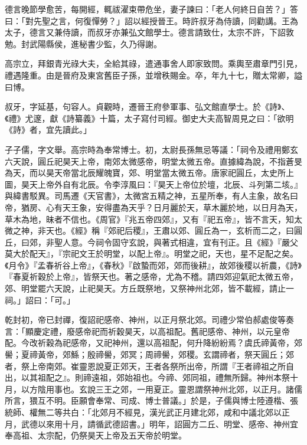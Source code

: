 \begin{pinyinscope}
 德言晚節學愈苦，每開經，輒祓濯束帶危坐，妻子諫曰：「老人何終日自苦？」答曰：「對先聖之言，何復憚勞？」詔以經授晉王。時許叔牙為侍讀，同勸講。王為太子，德言又兼侍讀，而叔牙亦兼弘文館學士。德言請致仕，太宗不許，下詔敦勉。封武陽縣侯，進秘書少監，久乃得謝。



 高宗立，拜銀青光祿大夫，全給其祿，遣通事舍人即家致問。乘輿至肅章門引見，禮遇隆重。由是晉府及東宮舊臣子孫，並增秩賜金。卒，年九十七，贈太常卿，謚曰博。



 叔牙，字延基，句容人。貞觀時，遷晉王府參軍事、弘文館直學士。於《詩》、《禮》尤邃，獻《詩纂義》十篇，太子寫付司經。御史大夫高智周見之曰：「欲明《詩》者，宜先讀此。」



 子子儒，字文舉。高宗時為奉常博士。初，太尉長孫無忌等議：「祠令及禮用鄭玄六天說，圓丘祀昊天上帝，南郊太微感帝，明堂太微五帝。直據緯為說，不指蒼旻為天，而以昊天帝當北辰耀魄寶，郊、明堂當太微五帝。唐家祀圓丘，太史所上圖，昊天上帝外自有北辰。令李淳風曰：『昊天上帝位於壇，北辰、斗列第二垓。』與緯書駁異。司馬遷《天官書》，太微宮五精之神，五星所奉，有人主象，故名曰帝，猶房、心有天王象，安得盡為天乎？日月麗於天，草木麗於地，以日月為天，草木為地，昧者不信也。《周官》『兆五帝四郊』，又有『祀五帝』，皆不言天，知太微之神，非天也。《經》稱『郊祀后稷』，王肅以郊、圓丘為一，玄析而二之，曰圓丘，曰郊，非聖人意。今祠令固守玄說，與著式相違，宜有刊正。且《經》『嚴父莫大於配天』，『宗祀文王於明堂，以配上帝』。明堂之祀，天也，星不足配之矣。《月令》『孟春祈谷上帝』，《春秋》『啟蟄而郊，郊而後耕』，故郊後稷以祈農，《詩》『春夏祈穀於上帝』，皆祭天也。著之感帝，尤為不稽。請四郊迎氣祀太微五帝，郊、明堂罷六天說，止祀昊天。方丘既祭地，又祭神州北郊，皆不載經，請止一祠。」詔曰：「可。」



 乾封初，帝已封禪，復詔祀感帝、神州，以正月祭北郊。司禮少常伯郝處俊等奏言：「顯慶定禮，廢感帝祀而祈穀昊天，以高祖配。舊祀感帝、神州，以元皇帝配。今改祈穀為祀感帝，又祀神州，還以高祖配，何升降紛紛焉？虞氏禘黃帝，郊嚳；夏禘黃帝，郊鯀；殷禘嚳，郊冥；周禘嚳，郊稷。玄謂禘者，祭天圓丘；郊者，祭上帝南郊。崔靈恩說夏正郊天，王者各祭所出帝，所謂『王者禘祖之所自出，以其祖配之』。則禘遠祖，郊始祖也。今禘、郊同祖，禮無所歸。神州本祭十月，以方陰用事也。玄說三王之郊，一用夏正。靈恩謂祭神州北郊，以正月。諸儒所言，猥互不明。臣願會奉常、司成、博士普議。」於是，子儒與博士陸遵楷、張統師、權無二等共白：「北郊月不經見，漢光武正月建北郊，咸和中議北郊以正月，武德以來用十月，請循武德詔書。」明年，詔圓方二丘、明堂、感帝、神州宜奉高祖、太宗配，仍祭昊天上帝及五天帝於明堂。




\end{pinyinscope}
